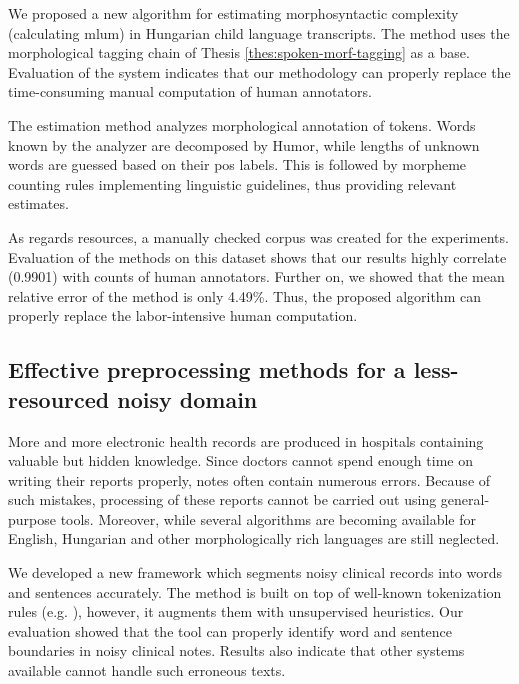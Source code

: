 \begin{core}
\begin{thesis}
\label{thes:mlu-estimation}
We proposed a new algorithm for estimating morphosyntactic complexity (calculating \acrlong{mlum}) in Hungarian child language transcripts.
The method uses the morphological tagging chain of Thesis \ref{thes:spoken-morf-tagging} as a base.
Evaluation of the system indicates that our methodology can properly replace the time-consuming manual computation of human annotators.
\end{thesis}

\begin{pub}
\cite{Matyus2014,Orosz2014c}
\end{pub}
\end{core}

The estimation method analyzes morphological annotation of tokens.
Words known by the analyzer are decomposed by Humor, while lengths of unknown words are guessed based on their \acrshort{pos} labels.
This is followed by morpheme counting rules implementing linguistic guidelines, thus providing relevant estimates.

As regards resources, a manually checked corpus was created for the experiments.
Evaluation of the methods on this dataset shows that our results highly correlate (0.9901) with counts of human annotators.
Further on, we showed that the mean relative error of the method is only 4.49\%.
Thus, the proposed algorithm can properly replace the labor-intensive human computation.

\subsection{Effective preprocessing methods for a less-resourced noisy domain}
\label{thes:clin}

More and more electronic health records are produced in hospitals containing valuable but hidden knowledge.
Since doctors cannot spend enough time on writing their reports properly, notes often contain numerous errors.
Because of such mistakes, processing of these reports cannot be carried out using general-purpose tools.
Moreover, while several algorithms are becoming available for English, Hungarian and other morphologically rich languages are still neglected.

\begin{core}
\begin{thesis}%
\label{thes:clin-segment}
We developed a new framework which segments noisy clinical records into words and sentences accurately.
The method is built on top of well-known tokenization rules (e.g. \cite{Halacsy2004}), however, it augments them with unsupervised heuristics.
Our evaluation showed that the tool can properly identify word and sentence boundaries in noisy clinical notes. 
Results also indicate that other systems available cannot handle such erroneous texts.
\end{thesis}

\begin{pub}
\cite{Orosz2013d,Orosz2014a,Orosz2014x}
\end{pub}
\end{core}

